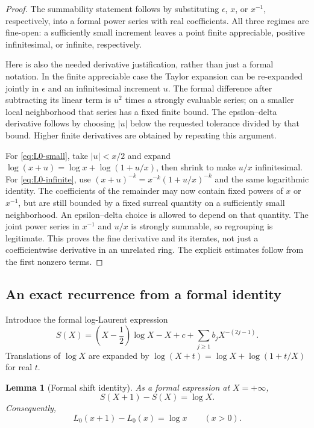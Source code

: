 \documentclass[11pt,letterpaper]{article}
\numberwithin{equation}{section}
\theoremstyle{plain}
\newtheorem{lemma}[lemma]{Lemma}
\theoremstyle{definition}
\theoremstyle{remark}
\newcommand{\abs}[1]{\lvert#1\rvert}
\begin{document}
\begin{proof}
The summability statement follows by substituting $\epsilon$, $x$, or
$x^{-1}$, respectively, into a formal power series with real coefficients.
All three regimes are fine-open: a sufficiently small increment leaves a
point finite appreciable, positive infinitesimal, or infinite, respectively.

Here is also the needed derivative justification, rather than just a formal
notation. In the finite appreciable case the Taylor expansion can be
re-expanded jointly in $\epsilon$ and an infinitesimal increment $u$.
The formal difference after subtracting its linear term is $u^2$ times a
strongly evaluable series; on a smaller local neighborhood that series has
a fixed finite bound. The epsilon--delta derivative follows by choosing
$\abs u$ below the requested tolerance divided by that bound. Higher
finite derivatives are obtained by repeating this argument.

For \eqref{eq:L0-small}, take $\abs u< x/2$ and expand
$\log(x+u)=\log x+\log(1+u/x)$, then shrink to make $u/x$
infinitesimal. For \eqref{eq:L0-infinite}, use
$(x+u)^{-k}=x^{-k}(1+u/x)^{-k}$ and the same logarithmic identity.
The coefficients of the remainder may now contain fixed powers of $x$ or
$x^{-1}$, but are still bounded by a fixed surreal quantity on a sufficiently
small neighborhood. An epsilon--delta choice is allowed to depend on that
quantity. The joint power series in $x^{-1}$ and $u/x$ is strongly summable,
so regrouping is legitimate. This proves the fine derivative and its
iterates, not just a coefficientwise derivative in an unrelated ring.
The explicit estimates follow from the first nonzero terms.
\end{proof}

\subsection{An exact recurrence from a formal identity}
Introduce the formal log-Laurent expression
\[
 S(X)=\left(X-\frac12\right)\log X-X+c+
 \sum_{j\ge1}b_jX^{-(2j-1)}.
\]
Translations of $\log X$ are expanded by
$\log(X+t)=\log X+\log(1+t/X)$ for real $t$.

\begin{lemma}[Formal shift identity]\label{lem:formal-shift}
As a formal expression at $X=+\infty$,
\begin{equation}\label{eq:formal-shift}
 S(X+1)-S(X)=\log X.
\end{equation}
Consequently,
\begin{equation}\label{eq:baseline-recurrence}
 L_0(x+1)-L_0(x)=\log x\qquad(x>0).
\end{equation}
\end{lemma}
\end{document}
